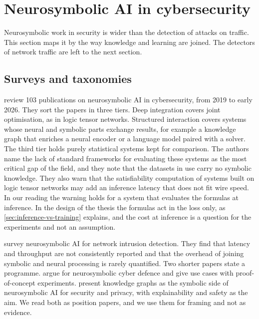 \section{Neurosymbolic AI in cybersecurity}
\label{sec:nesy-cybersecurity}

Neurosymbolic work in security is wider than the detection of attacks on
traffic. This section maps it by the way knowledge and learning are joined. The
detectors of network traffic are left to the next section.

\subsection{Surveys and taxonomies}
\label{sec:nesy-cyber-surveys}

\citet{hakim2025nesycybersecurity} review 103 publications on neurosymbolic AI
in cybersecurity, from 2019 to early 2026. They sort the papers in three tiers.
Deep integration covers joint optimisation, as in logic tensor networks.
Structured interaction covers systems whose neural and symbolic parts exchange
results, for example a knowledge graph that enriches a neural encoder or a
language model paired with a solver. The third tier holds purely statistical
systems kept for comparison. The authors name the lack of standard frameworks
for evaluating these systems as the most critical gap of the field, and they
note that the datasets in use carry no symbolic knowledge. They also warn that
the satisfiability computation of systems built on logic tensor networks may
add an inference latency that does not fit wire speed. In our reading the warning holds for a system that evaluates the formulas at
inference. In the design of the thesis the
formulas act in the loss only, as \cref{sec:inference-vs-training} explains, and
the cost at inference is a question for the experiments and not an assumption.

\citet{bizzarri2025survey} survey neurosymbolic AI for network intrusion
detection. They find that latency and throughput are not consistently reported
and that the overhead of joining symbolic and neural processing is rarely
quantified. Two shorter papers state a programme. \citet{grov2024neurosymbolic}
argue for neurosymbolic cyber defence and give use cases with proof-of-concept
experiments. \citet{piplai2023knowledge} present knowledge graphs as the
symbolic side of neurosymbolic AI for security and privacy, with explainability
and safety as the aim. We read both as position papers, and we use them for
framing and not as evidence.

